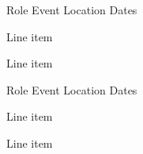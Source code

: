 

\begin{cventries}

  \cventry
    {Role} %
    {Event} %
    {Location} %
    {Dates} %
    {} %
    {
      \begin{cvitems} %
        \item {Line item}
        \item {Line item}
      \end{cvitems}
    }

  \cventry
    {Role} %
    {Event} %
    {Location} %
    {Dates} %
    {} %
    {
    \begin{cvitems} %
        \item {Line item}
        \item {Line item}
    \end{cvitems}
    }

\end{cventries}
